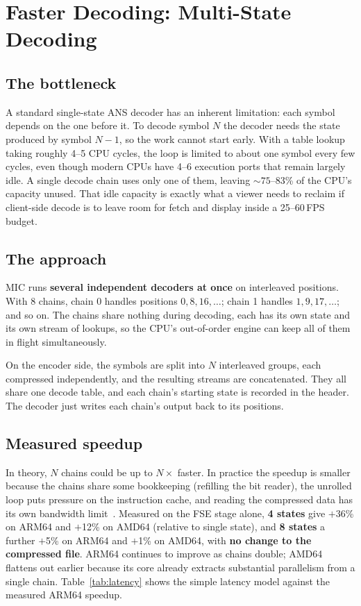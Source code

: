 \documentclass[journal]{IEEEtran}
\begin{document}
\section{Faster Decoding: Multi-State Decoding}
\label{sec:multistate}

\subsection{The bottleneck}

A standard single-state ANS decoder has an inherent limitation: each symbol
depends on the one before it. To decode symbol $N$ the decoder needs the state
produced by symbol $N-1$, so the work cannot start early. With a table lookup
taking roughly 4--5 CPU cycles, the loop is limited to about one symbol every
few cycles, even though modern CPUs have 4--6 execution ports that remain
largely idle. A single decode chain uses only one of them, leaving
${\sim}75$--83\% of the CPU's capacity unused. That idle capacity is exactly
what a viewer needs to reclaim if client-side decode is to leave room for fetch
and display inside a 25--60\,FPS budget.

\subsection{The approach}

MIC runs \textbf{several independent decoders at once} on interleaved
positions. With 8 chains, chain 0 handles positions $0, 8, 16, \ldots$; chain 1
handles $1, 9, 17, \ldots$; and so on. The chains share nothing during
decoding, each has its own state and its own stream of lookups, so the CPU's
out-of-order engine can keep all of them in flight simultaneously.

On the encoder side, the symbols are split into $N$ interleaved groups, each
compressed independently, and the resulting streams are concatenated. They
all share one decode table, and each chain's starting state is recorded in
the header. The decoder just writes each chain's output back to its
positions.

\subsection{Measured speedup}

In theory, $N$ chains could be up to $N\times$ faster. In practice the speedup
is smaller because the chains share some bookkeeping (refilling the bit
reader), the unrolled loop puts pressure on the instruction cache, and reading
the compressed data has its own bandwidth limit~\cite{williams2009}. Measured
on the FSE stage alone, \textbf{4 states} give $+$36\% on ARM64 and $+$12\% on
AMD64 (relative to single state), and \textbf{8 states} a further $+$5\% on
ARM64 and $+$1\% on AMD64, with \textbf{no change to the compressed file}.
ARM64 continues to improve as chains double; AMD64 flattens out earlier because
its core already extracts substantial parallelism from a single chain.
Table~\ref{tab:latency} shows the simple latency model against the measured
ARM64 speedup.
\end{document}
